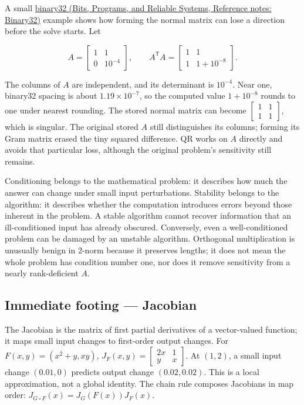 A small \href{../01-Bits-Programs-and-Reliable-Systems/main.pdf\#nameddest=appendix-5057f9ad327f}{binary32 (Bits, Programs, and Reliable Systems, Reference notes: Binary32)} example shows how forming the normal matrix can lose a direction before the solve starts. Let

\[
A=\begin{bmatrix}1&1\\0&10^{-4}\end{bmatrix},\qquad
A^\mathsf TA=\begin{bmatrix}1&1\\1&1+10^{-8}\end{bmatrix}.
\]

The columns of \(A\) are independent, and its determinant is \(10^{-4}\). Near one, binary32 spacing is about \(1.19\times10^{-7}\), so the computed value \(1+10^{-8}\) rounds to one under nearest rounding. The stored normal matrix can become \(\begin{bmatrix}1&1\\1&1\end{bmatrix}\), which is singular. The original stored \(A\) still distinguishes its columns; forming its Gram matrix erased the tiny squared difference. QR works on \(A\) directly and avoids that particular loss, although the original problem's sensitivity still remains.

Conditioning belongs to the mathematical problem: it describes how much the answer can change under small input perturbations. Stability belongs to the algorithm: it describes whether the computation introduces errors beyond those inherent in the problem. A stable algorithm cannot recover information that an ill-conditioned input has already obscured. Conversely, even a well-conditioned problem can be damaged by an unstable algorithm. Orthogonal multiplication is unusually benign in 2-norm because it preserves lengths; it does not mean the whole problem has condition number one, nor does it remove sensitivity from a nearly rank-deficient \(A\).

\subsection{Immediate footing --- Jacobian}\label{01-foundations-i-ch020-immediate-footing-jacobian}

\hypertarget{01-foundations-i-ch020-immediate-footing-jacobian}{}

The Jacobian is the matrix of first partial derivatives of a vector-valued function; it maps small input changes to first-order output changes. For \(F(x,y)=(x^2+y,xy)\), \(J_F(x,y)=\begin{bmatrix}2x&1\\y&x\end{bmatrix}\). At \((1,2)\), a small input change \((0.01,0)\) predicts output change \((0.02,0.02)\). This is a local approximation, not a global identity. The chain rule composes Jacobians in map order: \(J_{G\circ F}(x)=J_G(F(x))J_F(x)\).

